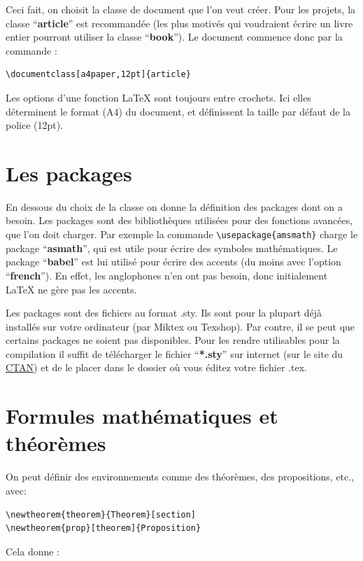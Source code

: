 Ceci fait, on choisit la classe de document  que l'on veut créer.  Pour les projets,  
la classe ``\textbf{article}'' est recommandée (les plus motivés qui voudraient écrire un 
livre entier pourront utiliser la classe ``\textbf{book}''). Le document commence donc par la 
commande :\medskip

\begin{lstlisting}
\documentclass[a4paper,12pt]{article}
\end{lstlisting}

Les options d'une fonction \LaTeX{} sont toujours entre crochets. Ici elles déterminent le format 
(A4) du document, et définissent la taille par d\'efaut de la police (12pt).

\section{Les packages}

En dessous du choix de la classe on donne la définition des packages dont on a besoin. 
Les packages sont des bibliothèques utilisées pour des fonctions avancées, que l'on doit charger.
 Par exemple la commande  \lstinline+\usepackage{amsmath}+ charge le package ``\textbf{asmath}'',
 qui est utile  pour écrire des symboles mathématiques. Le package ``\textbf{babel}''  est lui 
utilisé pour écrire des accents (du moins avec l'option ``\textbf{french}''). En effet, les anglophones
 n'en ont pas besoin, donc initialement \LaTeX{} ne gère pas les accents. 

Les packages sont des fichiers au format .sty. Ils sont pour la plupart déjà installés sur votre 
ordinateur (par Miktex ou Texshop). Par contre, il se peut que certains packages ne soient pas 
disponibles.  Pour les rendre utilisables pour la compilation il suffit de télécharger le fichier 
``\textbf{*.sty}''  sur internet (\eg sur le site du  \href{http://www.ctan.org/}{CTAN})
  et de le placer dans le dossier où vous éditez votre fichier .tex.

\section{Formules mathématiques et théorèmes}
On peut définir des environnements comme des théorèmes, des propositions, etc., avec:\medskip
\begin{lstlisting}
\newtheorem{theorem}{Theorem}[section] 
\newtheorem{prop}[theorem]{Proposition}
\end{lstlisting}
Cela donne :


